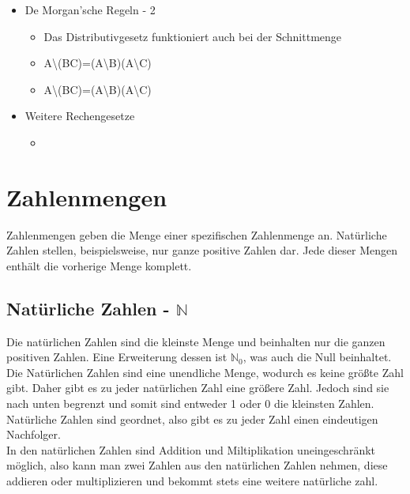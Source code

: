 \documentclass{article}
\newcommand{\N}{\mathbb{N}}
\begin{document}
\begin{itemize}
		\begin{itemize}
			\item{Die Umkehrung eines Ausdrucks kehrt alle Mengen sowie die Verbindung um (\cup zu \cap und umgekehrt)}
			\item{(A\cap B)'=A'\cup B'}
			\item{(A\cup B)'=A'\cap B'}
		\end{itemize}
		\item{De Morgan'sche Regeln - 2}
		\begin{itemize}
			\item{Das Distributivgesetz funktioniert auch bei der Schnittmenge}
			\item{A\textbackslash (B\cap C)=(A\textbackslash B)\cup (A\textbackslash C)}
			\item{A\textbackslash (B\cup C)=(A\textbackslash B)\cap (A\textbackslash C)}
		\end{itemize}
		\item{Weitere Rechengesetze}
		\begin{itemize}
			\item{}
		\end{itemize}
	\end{itemize}
	\section{Zahlenmengen}
	Zahlenmengen geben die Menge einer spezifischen Zahlenmenge an. Natürliche Zahlen stellen, beispielsweise, nur ganze positive Zahlen dar. Jede dieser Mengen enthält die vorherige Menge komplett.
	\subsection{Natürliche Zahlen - \texorpdfstring{$\N$}{}}
	Die natürlichen Zahlen sind die kleinste Menge und beinhalten nur die ganzen positiven Zahlen. Eine Erweiterung dessen ist $\N_0$, was auch die Null beinhaltet. Die Natürlichen Zahlen sind eine unendliche Menge, wodurch es keine größte Zahl gibt. Daher gibt es zu jeder natürlichen Zahl eine größere Zahl. Jedoch sind sie nach unten begrenzt und somit sind entweder 1 oder 0 die kleinsten Zahlen. Natürliche Zahlen sind geordnet, also gibt es zu jeder Zahl einen eindeutigen Nachfolger. \\
	In den natürlichen Zahlen sind Addition und Miltiplikation uneingeschränkt möglich, also kann man zwei Zahlen aus den natürlichen Zahlen nehmen, diese addieren oder multiplizieren und bekommt stets eine weitere natürliche zahl.
\end{document}
